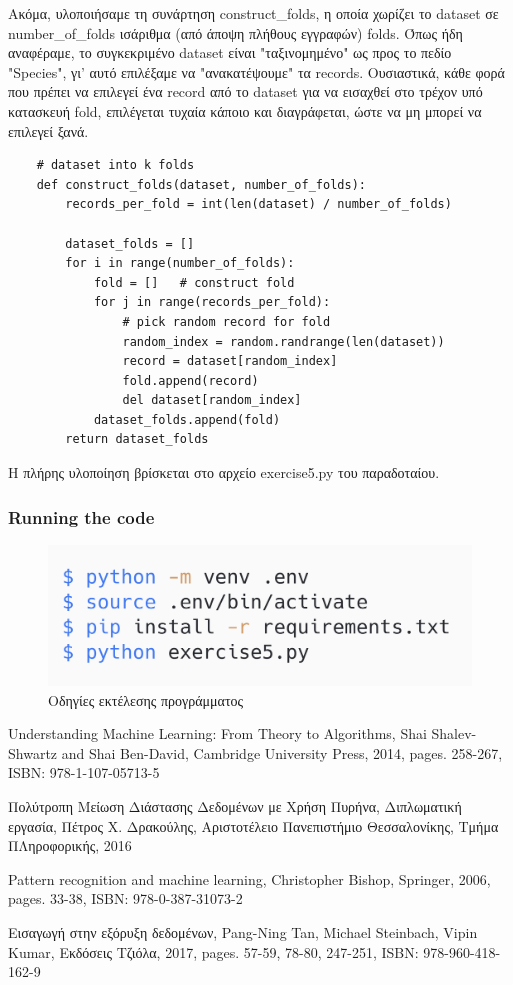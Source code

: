 \documentclass[12pt]{article}
\newenvironment{matlab}
	{\begin{figure}[H]\centering\captionsetup{justification=centering}}
	{\end{figure}}
\begin{document}
Ακόμα, υλοποιήσαμε τη συνάρτηση construct\_folds, η οποία χωρίζει το dataset σε number\_of\_folds ισάριθμα (από άποψη πλήθους εγγραφών) folds. Όπως ήδη αναφέραμε, το συγκεκριμένο dataset είναι "ταξινομημένο" ως προς το πεδίο "Species", γι' αυτό επιλέξαμε να "ανακατέψουμε" τα records. Ουσιαστικά, κάθε φορά που πρέπει να επιλεγεί ένα record από το dataset για να εισαχθεί στο τρέχον υπό κατασκευή fold, επιλέγεται τυχαία κάποιο και διαγράφεται, ώστε να μη μπορεί να επιλεγεί ξανά.

\begin{lstlisting}
	# dataset into k folds
	def construct_folds(dataset, number_of_folds):
		records_per_fold = int(len(dataset) / number_of_folds)

		dataset_folds = []
		for i in range(number_of_folds):
			fold = []   # construct fold
			for j in range(records_per_fold):
				# pick random record for fold
				random_index = random.randrange(len(dataset))
				record = dataset[random_index]
				fold.append(record)
				del dataset[random_index]
			dataset_folds.append(fold)
		return dataset_folds
\end{lstlisting}

Η πλήρης υλοποίηση βρίσκεται στο αρχείο exercise5.py του παραδοταίου. \\

\subsubsection*{Running the code}

\begin{matlab}
	\includegraphics[scale=0.3]{images/exercise5_run.png}
	\caption{Οδηγίες εκτέλεσης προγράμματος}
\end{matlab}

\pagebreak

\begin{thebibliography}{9}
	Understanding Machine Learning: From Theory to Algorithms,
	Shai Shalev-Shwartz and Shai Ben-David,
	Cambridge University Press, 2014,
	pages. 258-267,
	ISBN: 978-1-107-05713-5

	Πολύτροπη Μείωση Διάστασης Δεδομένων με Χρήση Πυρήνα,
	Διπλωματική εργασία,
	Πέτρος Χ. Δρακούλης,
	Αριστοτέλειο Πανεπιστήμιο Θεσσαλονίκης, Τμήμα ΠΛηροφορικής, 2016

	Pattern recognition and machine learning,
	Christopher Bishop,
	Springer, 2006,
	pages. 33-38,
	ISBN: 978-0-387-31073-2

	Εισαγωγή στην εξόρυξη δεδομένων,
	Pang-Ning Tan, Michael Steinbach, Vipin Kumar,
	Εκδόσεις Τζιόλα, 2017,
	pages. 57-59, 78-80, 247-251,
	ISBN: 978-960-418-162-9

\end{thebibliography}
\end{document}
